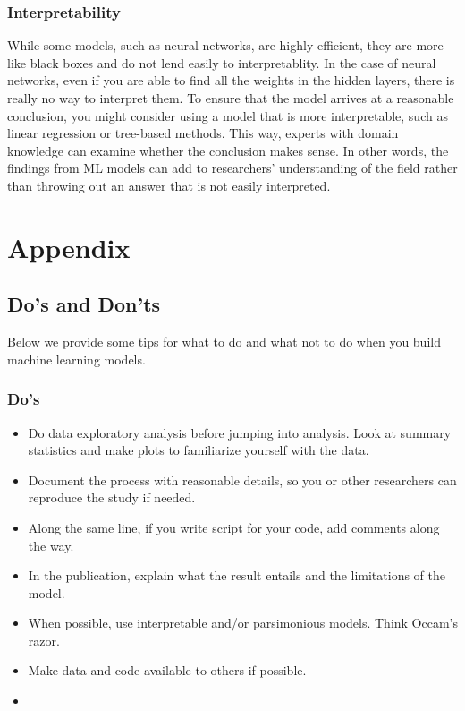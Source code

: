 \documentclass[
]{book}
\providecommand{\tightlist}{%
  \setlength{\itemsep}{0pt}\setlength{\parskip}{0pt}}
\begin{document}
\hypertarget{interpretability}{%
\subsection{Interpretability}\label{interpretability}}

While some models, such as neural networks, are highly efficient, they are more like black boxes and do not lend easily to interpretablity. In the case of neural networks, even if you are able to find all the weights in the hidden layers, there is really no way to interpret them. To ensure that the model arrives at a reasonable conclusion, you might consider using a model that is more interpretable, such as linear regression or tree-based methods. This way, experts with domain knowledge can examine whether the conclusion makes sense. In other words, the findings from ML models can add to researchers' understanding of the field rather than throwing out an answer that is not easily interpreted.

\hypertarget{appendix}{%
\chapter{Appendix}\label{appendix}}

\hypertarget{dos-and-donts}{%
\section{Do's and Don'ts}\label{dos-and-donts}}

Below we provide some tips for what to do and what not to do when you build machine learning models.

\hypertarget{dos}{%
\subsection{Do's}\label{dos}}

\begin{itemize}
\tightlist
\item
  Do data exploratory analysis before jumping into analysis. Look at summary statistics and make plots to familiarize yourself with the data.
\item
  Document the process with reasonable details, so you or other researchers can reproduce the study if needed.
\item
  Along the same line, if you write script for your code, add comments along the way.
\item
  In the publication, explain what the result entails and the limitations of the model.
\item
  When possible, use interpretable and/or parsimonious models. Think Occam's razor.
\item
  Make data and code available to others if possible.
\item
\end{itemize}
\end{document}

